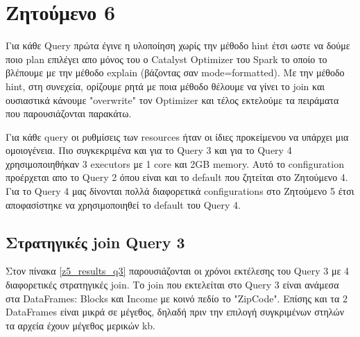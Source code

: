 \documentclass[12pt, a4paper]{article}
\begin{document}
\section*{Ζητούμενο 6}

Για κάθε Query πρώτα έγινε η υλοποίηση χωρίς την μέθοδο hint έτσι ωστε να δούμε ποιο
plan επιλέγει απο μόνος του ο Catalyst Optimizer του Spark το οποίο το βλέπουμε με την μέθοδο
explain (βάζοντας σαν mode=formatted). Με την μέθοδο hint, στη συνεχεία, ορίζουμε ρητά με ποια μέθοδο θέλουμε να γίνει
το join και ουσιαστικά κάνουμε "overwrite" τον Optimizer και τέλος 
εκτελούμε τα πειράματα που παρουσιάζονται παρακάτω.





Για κάθε query οι ρυθμίσεις των resources ήταν οι ίδιες προκείμενου να υπάρχει μια
ομοιογένεια. Πιο συγκεκριμένα και για το Query 3 και για το Query 4 χρησιμοποιηθήκαν 
3 executors με 1 core και 2GB memory. Αυτό το configuration προέρχεται απο το Query 2
όπου είναι και το default που ζητείται στο Ζητούμενο 4. Για το Query 4 μας δίνονται πολλά
διαφορετικά configurations στο Ζητούμενο 5 έτσι αποφασίστηκε να χρησιμοποιηθεί το default
του Query 4.


\subsection*{Στρατηγικές join Query 3}

Στον πίνακα \ref{z5_results_q3} παρουσιάζονται οι χρόνοι εκτέλεσης του Query 3 με 4 διαφορετικές
στρατηγικές join. Το join που εκτελείται στο Query 3 είναι ανάμεσα στα DataFrames: Blocks και 
Income με κοινό πεδίο το "ZipCode". Επίσης και τα 2 DataFrames είναι μικρά σε μέγεθος, δηλαδή πριν
την επιλογή συγκριμένων στηλών τα αρχεία έχουν μέγεθος μερικών kb.
\end{document}
